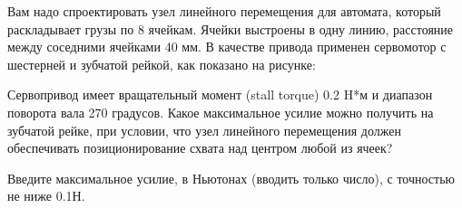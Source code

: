 
Вам надо спроектировать узел линейного перемещения для автомата, который раскладывает грузы по 8 ячейкам.  Ячейки выстроены в одну линию,  расстояние между соседними ячейками 40 мм.  В качестве привода применен сервомотор с шестерней и зубчатой рейкой, как показано на рисунке:


Сервопривод имеет вращательный момент (stall torque) 0.2 H*м  и диапазон поворота вала 270 градусов.  Какое максимальное усилие можно получить на зубчатой рейке, при условии, что узел линейного перемещения должен обеспечивать позиционирование схвата над центром любой из ячеек?   

Введите максимальное усилие, в Ньютонах (вводить только число),  с точностью не ниже 0.1Н.